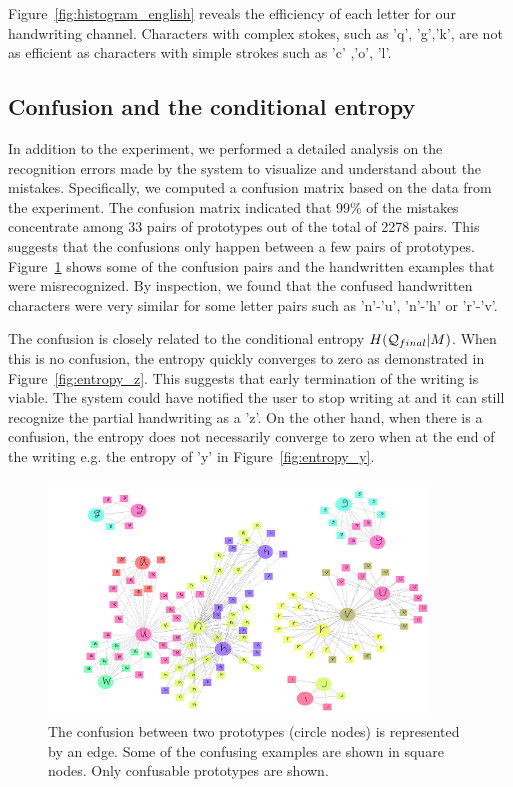 \documentclass{sigchi}
\begin{document}
Figure~\ref{fig:histogram_english} reveals the efficiency of each
letter for our handwriting channel. Characters with complex stokes,
such as 'q', 'g','k', are not as efficient as characters with simple
strokes such as 'c' ,'o', 'l'. 

\subsection{Confusion and the conditional entropy}

In addition to the experiment, we performed a detailed analysis on the
recognition errors made by the system to visualize and understand
about the mistakes. Specifically, we computed a confusion matrix based
on the data from the experiment. The confusion matrix indicated that
99\% of the mistakes concentrate among 33 pairs of prototypes out of
the total of 2278 pairs. This suggests that the confusions only happen
between a few pairs of prototypes. Figure~\ref{fig:prototypes} shows
some of the confusion pairs and the handwritten examples that were
misrecognized. By inspection, we found that the confused handwritten
characters were very similar for some letter pairs such as 'n'-'u',
'n'-'h' or 'r'-'v'.

The confusion is closely related to the conditional entropy
$H(\mathcal{Q}_{final} | M)$. When this is no confusion, the entropy quickly
converges to zero as demonstrated in Figure~\ref{fig:entropy_z}. This
suggests that early termination of the writing is viable. The system
could have notified the user to stop writing at  and it can
still recognize the partial handwriting as a 'z'. On the other hand,
when there is a confusion, the entropy does not necessarily converge
to zero when at the end of the writing e.g. the entropy of 'y' in
Figure~\ref{fig:entropy_y}.

\begin{figure}
  \centering
  \includegraphics[width=0.9\textwidth]{figures/confusion.pdf}
  \caption{The confusion between two prototypes (circle nodes)
    is represented by an edge. Some of the confusing examples are
    shown in square nodes. Only confusable prototypes are shown. }
  \label{fig:prototypes}
\end{figure}
\end{document}

